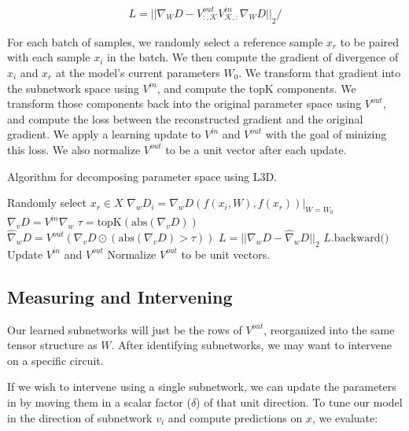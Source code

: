 \documentclass{article}
\theoremstyle{plain}
\theoremstyle{definition}
\theoremstyle{remark}
\begin{document}
\begin{equation}
    L = {|| \nabla_W D - V^{out}_{:,\mathcal{K}} V^{in}_{\mathcal{K},:} \nabla_W D ||}_2 /  
\end{equation}

For each batch of samples, we randomly select a reference sample $x_r$ to be paired with each sample $x_i$ in the batch. We then compute the gradient of divergence of $x_i$ and $x_r$ at the model's current parameters $W_0$. We transform that gradient into the subnetwork space using $V^{in}$, and compute the $\text{topK}$ components. We transform those components back into the original parameter space using $V^{out}$, and compute the loss between the reconstructed gradient and the original gradient. We apply a learning update to $V^{in}$ and $V^{out}$ with the goal of minizing this loss. We also normalize $V^{out}$ to be a unit vector after each update. 


\begin{algorithm}\label{alg:training}
\caption{Algorithm for decomposing parameter space using L3D.}
\begin{algorithmic}[1]
            \STATE Randomly select $x_r \in X$
            \STATE $\nabla_w D_i = \nabla_w D(f(x_i, W), f(x_r))|_{W=W_0}$
        \ENDFOR
        \STATE $\nabla_v D = {V^{in}} \nabla_w$
        \STATE $\tau = \text{topK}(\text{abs}(\nabla_v D))$
        \STATE $\hat{\nabla}_w D = {V^{out}} (\nabla_v D \odot (\text{abs}(\nabla_v D) > \tau))$
        \STATE $L = {|| \nabla_w D - \hat{\nabla}_w D ||}_2$
        \STATE $L.\text{backward()}$
        \STATE Update $V^{in}$ and $V^{out}$
        \STATE Normalize $V^{out}$ to be unit vectors.
    \ENDFOR
\ENDFOR
\end{algorithmic}
\end{algorithm}

\subsection{Measuring and Intervening}\label{sec:intervention}

Our learned subnetworks will just be the rows of $V^{out}$, reorganized into the same tensor structure as $W$. After identifying subnetworks, we may want to intervene on a specific circuit.

If we wish to intervene using a single subnetwork, we can update the parameters in by moving them in a scalar factor ($\delta$) of that unit direction. To tune our model in the direction of subnetwork $v_i$ and compute predictions on $x$, we evaluate:
\end{document}
